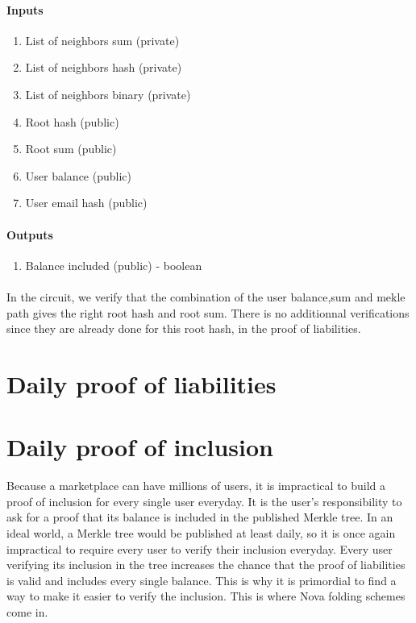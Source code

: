 \paragraph{Inputs}
\begin{enumerate}

    \item List of neighbors sum (private)
    
    \item List of neighbors hash (private)

    \item List of neighbors binary (private)

    \item Root hash (public)

    \item Root sum (public)

    \item User balance (public)

    \item User email hash (public)
    
    \end{enumerate}

\paragraph{Outputs}
\begin{enumerate}
    \item Balance included (public) - boolean
    \end{enumerate}

\paragraph{}
In the circuit, we verify that the combination of the user balance,sum and mekle path gives the right root hash and root sum. There is no additionnal
verifications since they are already done for this root hash, in the proof of liabilities.


\section{Daily proof of liabilities} 


\section{Daily proof of inclusion} 
Because a marketplace can have millions of users, it is impractical to build a proof of inclusion for every single user everyday. 
It is the user's responsibility to ask for a proof that its balance is included in the published Merkle tree.
 In an ideal world, a Merkle tree would be published at least daily, so it is once again impractical to require every user to verify their inclusion everyday. 
 Every user verifying its inclusion in the tree increases the chance that the proof of liabilities is valid and includes every single balance. 
 This is why it is primordial to find a way to make it easier to verify the inclusion. This is where Nova folding schemes come in.

